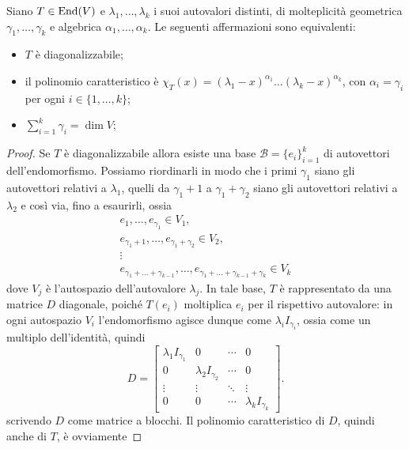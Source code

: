 \begin{teorema} \label{t:diagonalizzabilita}
	Siano $T\in\operatorname{End}(V)$ e $\lambda_1,\dots,\lambda_k$ i suoi autovalori distinti, di molteplicità geometrica $\gamma_1,\dots,\gamma_k$ e algebrica $\alpha_1,\dots,\alpha_k$.
	Le seguenti affermazioni sono equivalenti:
	\begin{itemize}
		\item $T$ è diagonalizzabile;
		\item il polinomio caratteristico è $\chi_T(x)=(\lambda_1-x)^{\alpha_1}\dots(\lambda_k-x)^{\alpha_k}$, con $\alpha_i=\gamma_i$ per ogni $i\in\{1,\dots,k\}$;
		\item $\sum_{i=1}^k\gamma_i=\dim V$;
	\end{itemize}
\end{teorema}
\begin{proof}
 	Se $T$ è diagonalizzabile allora esiste una base $\mathcal B=\{e_i\}_{i=1}^k$ di autovettori dell'endomorfismo.
	Possiamo riordinarli in modo che i primi $\gamma_1$ siano gli autovettori relativi a $\lambda_1$, quelli da $\gamma_1+1$ a $\gamma_1+\gamma_2$ siano gli autovettori relativi a $\lambda_2$ e cos\`i via, fino a esaurirli, ossia
	\begin{gather*}
		e_1,\dots,e_{\gamma_1}\in V_1,\\
		e_{\gamma_1 + 1},\dots,e_{\gamma_1 + \gamma_2}\in V_2,\\
		\vdots\\
		e_{\gamma_1 + \dots + \gamma_{k-1}},\dots,e_{\gamma_1 + \dots + \gamma_{k-1} + \gamma_k}\in V_k
	\end{gather*}
	dove $V_j$ è l'autospazio dell'autovalore $\lambda_j$.
	In tale base, $T$ è rappresentato da una matrice $D$ diagonale, poich\'e $T(e_i)$ moltiplica $e_i$ per il rispettivo autovalore: in ogni autospazio $V_i$ l'endomorfismo agisce dunque come $\lambda_i I_{\gamma_i}$, ossia come un multiplo dell'identità, quindi
	\begin{equation}
		D=
		\begin{bmatrix}
			\lambda_1 I_{\gamma_1}	& 0							& \cdots	& 0\\
			0						& \lambda_2 I_{\gamma_2}	& \cdots	& 0 \\
			\vdots					& \vdots					& \ddots	& \vdots \\
			0						& 0							& \cdots	& \lambda_k I_{\gamma_k}
		\end{bmatrix}.
	\end{equation}
	scrivendo $D$ come matrice a blocchi.
	Il polinomio caratteristico di $D$, quindi anche di $T$, è ovviamente

\end{proof}
